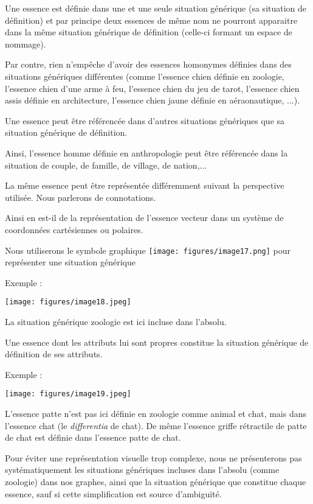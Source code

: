 \documentclass[a4paper, 12pt, openright, french]{book}
\begin{document}
Une essence est définie dans une et une seule situation générique (sa
situation de définition) et par principe deux essences de même nom ne
pourront apparaitre dans la même situation générique de définition
(celle-ci formant un espace de nommage).

Par contre, rien n'empêche d'avoir des
essences homonymes définies dans des situations génériques différentes
(comme l'essence chien définie en zoologie,
l'essence chien d'une arme à feu,
l'essence chien du jeu de tarot,
l'essence chien assis définie en architecture,
l'essence chien jaune définie en aéraonautique, ...).

Une essence peut être référencée dans d'autres
situations génériques que sa situation générique de définition.

Ainsi, l'essence homme définie en anthropologie peut
être référencée dans la situation de couple, de famille, de village, de
nation,...

La même essence peut être représentée différemment suivant la
perspective utilisée. Nous parlerons de connotations.

Ainsi en est-il de la représentation de l'essence
vecteur dans un système de coordonnées cartésiennes ou polaires.

Nous utiliserons le symbole graphique
\texttt{[image: figures/image17.png]}
pour représenter une situation générique

Exemple :

\texttt{[image: figures/image18.jpeg]}

La situation générique zoologie est ici incluse dans
l'absolu.

Une essence dont les attributs lui sont propres constitue la situation
générique de définition de ses attributs.

Exemple :

\texttt{[image: figures/image19.jpeg]}

L'essence patte n'est pas ici définie en
zoologie comme animal et chat, mais dans l'essence chat
(le \emph{differentia} de chat). De même l'essence
griffe rétractile de patte de chat est définie dans
l'essence patte de chat.

Pour éviter une représentation visuelle trop complexe, nous ne
présenterons pas systématiquement les situations génériques incluses
dans l'absolu (comme zoologie) dans nos graphes, ainsi
que la situation générique que constitue chaque essence, sauf si cette
simplification est source d'ambiguïté.
\end{document}
